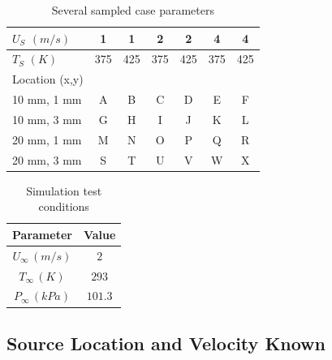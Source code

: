 \documentclass[preprint,12pt]{elsarticle}
\begin{document}
%
\begin{table}[!t!b!p]
\begin{center}
\begin{tabular}{ l | c c c c c c}
\hline
 $U_{S}$ $(m/s)$ & 1 & 1 & 2 & 2 & 4 & 4 \\ \hline
 $T_S$ $(K)$ & 375 & 425 & 375 & 425 & 375 & 425  \\ \hline \hline
 Location (x,y) & \\
 10 mm, 1 mm & A & B & C & D & E & F \\ \hline
 10 mm, 3 mm & G & H & I & J & K & L \\ \hline
 20 mm, 1 mm & M & N & O & P & Q & R \\ \hline
 20 mm, 3 mm & S & T & U & V & W & X \\ \hline
 \end{tabular}
\caption{Several sampled case parameters}
\label{tab:jetcases}
\end{center}
\end{table}
%
\begin{table}[!h!t!b!p]
\begin{center}
\begin{tabular}{ c c }
\hline
Parameter    & Value \\ \hline
$U_{\infty} \, (m/s)$ & $2$ \\
$T_{\infty} \, (K) $ & $293$ \\
$P_{\infty} \, (kPa) $ & $101.3$ \\ \hline
\end{tabular}
\caption{Simulation test conditions}
\label{tab:STjet}
\end{center}
\end{table}


\subsection{Source Location and Velocity Known}
\end{document}
